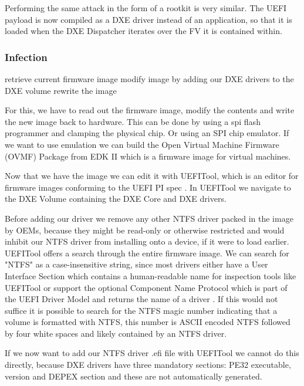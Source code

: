 Performing the same attack in the form of a rootkit is very similar. The \ac{UEFI} payload is now compiled as a \ac{DXE} driver instead of an application, so that it is loaded when the \ac{DXE} Dispatcher iterates over the \ac{FV} it is contained within.

\subsubsection{Infection}


retrieve current firmware image
modify image by adding our DXE drivers to the DXE volume
rewrite the image

For this, we have to read out the firmware image, modify the contents and write the new image back to hardware. This can be done by using a spi flash programmer and clamping the physical chip. Or using an SPI chip emulator. 
If we want to use emulation we can build the Open Virtual Machine Firmware (OVMF) Package from EDK II which is a firmware image for virtual machines.

Now that we have the image we can edit it with UEFITool, which is an editor for firmware images conforming to the UEFI PI spec \cite{uefitool}.
In UEFITool we navigate to the DXE Volume containing the DXE Core and DXE drivers.

Before adding our driver we remove any other NTFS driver packed in the image by OEMs, because they might be read-only or otherwise restricted and would inhibit our NTFS driver from installing onto a device, if it were to load earlier. UEFITool offers a search through the entire firmware image. We can search for "NTFS" as a case-insensitive string, since most drivers either have a User Interface Section which contains a human-readable name for inspection tools like UEFITool \cite[Vol 3, 3.2.5]{pi-spec} or support the optional Component Name Protocol which is part of the UEFI Driver Model and returns the name of a driver \cite[11.5]{uefi-spec}. If this would not suffice it is possible to search for the NTFS magic number indicating that a volume is formatted with NTFS, this number is ASCII encoded NTFS followed by four white spaces and likely contained by an NTFS driver.

If we now want to add our NTFS driver .efi file with UEFITool we cannot do this directly, because DXE drivers have three mandatory sections: PE32 executable, version and DEPEX section \cite[Vol 3, 2.1.4.1.4]{pi-spec} and these are not automatically generated.

